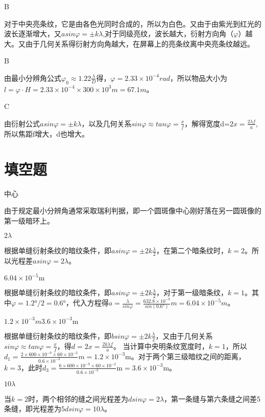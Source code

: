 \exercise B

\solve
对于中央亮条纹，它是由各色光同时合成的，所以为白色。又由于由紫光到红光的波长逐渐增大，又$asin\varphi=\pm k\lambda$,对于同级亮纹，波长越大，衍射方向角（$\varphi$）越大。又由于几何关系得衍射方向角越大，在屏幕上的亮条纹离中央亮条纹越远。

\exercise B

\solve
由最小分辨角公式$\varphi_0\approx1.22\frac{\lambda}{D}$得，$\varphi=2.33\times10^{-4}rad$，所以物品大小为$l=\varphi\cdot H=2.33\times10^{-4}\times300\times10^{3}m=67.1m$。

\exercise C

\solve
由衍射公式$asin\varphi=\pm k\lambda$，以及几何关系$sin\varphi\approx tan\varphi=\frac{x}{f}$，解得宽度d=$2x=\frac{2\lambda f}{a}$,所以焦距f增大，d也增大。

\section{填空题}
\exercise 中心

\solve
由于规定最小分辨角通常采取瑞利判据，即一个圆斑像中心刚好落在另一圆斑像的第一级暗环上。

\exercise $2\lambda$

\solve
根据单缝衍射条纹的暗纹条件，即$asin\varphi=\pm2k\frac{\lambda}{2}$，在第二个暗条纹时，$k=2$。所以光程差$asin\varphi=2\lambda$。

\exercise $6.04\times10^{-5}\mathrm{m}$

\solve
根据单缝衍射条纹的暗纹条件，即$asin\varphi=\pm2k\frac{\lambda}{2}$，对于第一级暗条纹，$k=1$。其中$\varphi=1.2°/2=0.6°$，代入方程得$a=\frac{\lambda}{sin\varphi}=\frac{632.8\times10^{-9}}{sin(0.6°)}m=6.04\times10^{-5}m$。

\exercise $1.2\times10^{-3}m$\quad $3.6\times10^{-3}\mathrm{m}$

\solve
根据单缝衍射条纹的暗纹条件，即$bsin\varphi=\pm2k\frac{\lambda}{2}$，又由于几何关系$sin\varphi\approx tan\varphi=\frac{x}{f}$，得$d=2x=\frac{2k\lambda f}{a}$。 当计算中央明条纹宽度时，$k=1$，所以$d_1=\frac{2\times600\times10^{-9}\times60\times10^{-2}}{0.6\times10^{-3}}m=1.2\times10^{-3}\mathrm{m}$。对于两个第三级暗纹之间的距离，$k=3$，此时$d_3=\frac{6\times600\times10^{-9}\times60\times10^{-2}}{0.6\times10^{-3}}\mathrm{m}=3.6\times10^{-3}\mathrm{m}$。

\exercise $10\lambda$

\solve
当$k=2$时，两个相邻的缝之间光程差为$dsin\varphi=2\lambda$，第一条缝与第六条缝之间差5条缝，即光程差为$5dsin\varphi=10\lambda$。

